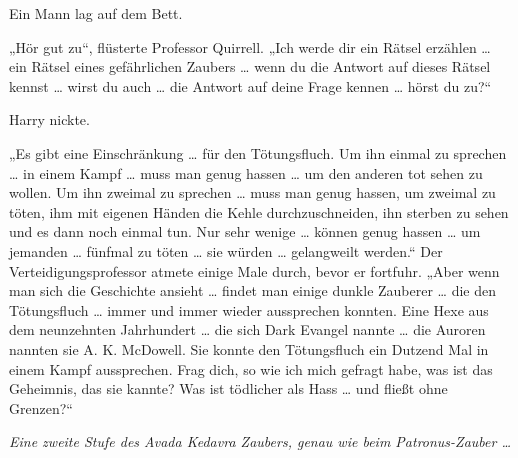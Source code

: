 Ein Mann lag auf dem Bett.

„Hör gut zu“, flüsterte Professor Quirrell.
„Ich werde dir ein Rätsel erzählen … ein Rätsel eines gefährlichen Zaubers … wenn du die Antwort auf dieses Rätsel kennst … wirst du auch … die Antwort auf deine Frage kennen … hörst du zu?“

Harry nickte.

„Es gibt eine Einschränkung … für den Tötungsfluch. Um ihn einmal zu sprechen … in einem Kampf … muss man genug hassen … um den anderen tot sehen zu wollen. Um ihn zweimal zu sprechen … muss man genug hassen, um zweimal zu töten, ihm mit eigenen Händen die Kehle durchzuschneiden, ihn sterben zu sehen und es dann noch einmal tun. Nur sehr wenige … können genug hassen … um jemanden … fünfmal zu töten … sie würden … gelangweilt werden.“
Der Verteidigungsprofessor atmete einige Male durch, bevor er fortfuhr.
„Aber wenn man sich die Geschichte ansieht … findet man einige dunkle Zauberer … die den Tötungsfluch … immer und immer wieder aussprechen konnten. Eine Hexe aus dem neunzehnten Jahrhundert … die sich Dark Evangel nannte … die Auroren nannten sie A. K. McDowell. Sie konnte den Tötungsfluch ein Dutzend Mal in einem Kampf aussprechen. Frag dich, so wie ich mich gefragt habe, was ist das Geheimnis, das sie kannte? Was ist tödlicher als Hass … und fließt ohne Grenzen?“

\emph{Eine zweite Stufe des Avada Kedavra Zaubers, genau wie beim Patronus-Zauber …}

